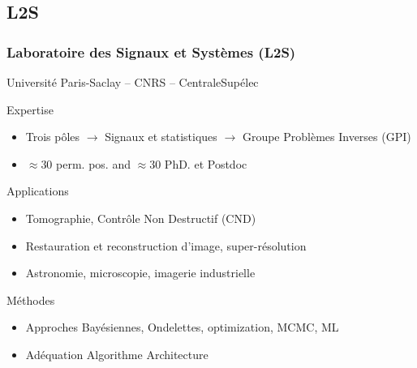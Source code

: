 \documentclass[usenames,dvipsnames]{beamer}
\begin{document}
\subsection{L2S}
\begin{frame}
  \frametitle{Laboratoire des Signaux et Systèmes (L2S)}

  \vfill %
  Université Paris-Saclay -- CNRS -- CentraleSupélec \vfill
  \vfill
  \begin{block}{Expertise}
      \begin{itemize}
      \item Trois pôles \(\rightarrow\) Signaux et statistiques \(\rightarrow\) Groupe Problèmes Inverses (GPI)
      \item \(\approx 30\) perm. pos. and \(\approx30\) PhD. et Postdoc
      \end{itemize}
  \end{block}
  \vfill
  \begin{block}{Applications}
    \begin{itemize}
    \item Tomographie, Contrôle Non Destructif (CND)
    \item Restauration et reconstruction d'image, super-résolution
    \item Astronomie, microscopie, imagerie industrielle
    \end{itemize}
  \end{block}
  \vfill
  \begin{block}{Méthodes}
    \begin{itemize}
    \item Approches Bayésiennes, Ondelettes, optimization, MCMC, ML
    \item Adéquation Algorithme Architecture
    \end{itemize}
  \end{block}
\end{frame}
\end{document}
